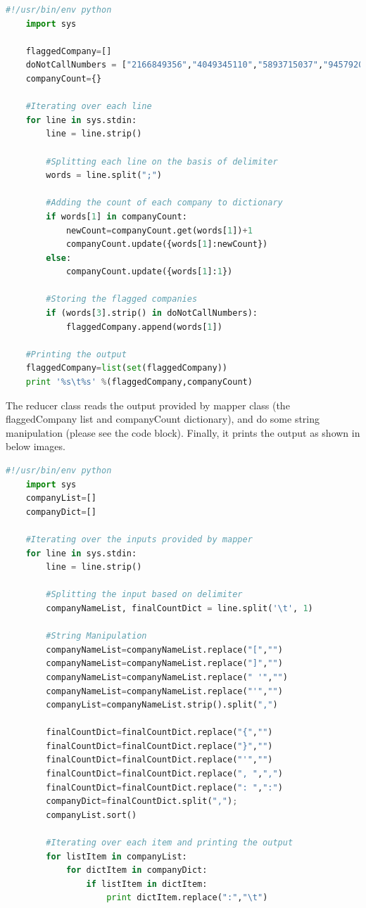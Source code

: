 \documentclass[a4paper, 10pt]{article}
\begin{document}
\begin{lstlisting}[language=Python, caption=Mapper for problem 2]
    #!/usr/bin/env python
    import sys
    
    flaggedCompany=[]
    doNotCallNumbers = ["2166849356","4049345110","5893715037","9457920329"]
    companyCount={}

    #Iterating over each line
    for line in sys.stdin:
        line = line.strip()

        #Splitting each line on the basis of delimiter
        words = line.split(";")

        #Adding the count of each company to dictionary
        if words[1] in companyCount:
            newCount=companyCount.get(words[1])+1
            companyCount.update({words[1]:newCount}) 
        else:
            companyCount.update({words[1]:1})

        #Storing the flagged companies   
        if (words[3].strip() in doNotCallNumbers):
            flaggedCompany.append(words[1])
    
    #Printing the output      
    flaggedCompany=list(set(flaggedCompany))
    print '%s\t%s' %(flaggedCompany,companyCount)  
\end{lstlisting}

The reducer class reads the output provided by mapper class (the flaggedCompany list and companyCount dictionary), and do some string manipulation (please see the code block). Finally, it prints the output as shown in below images.

\begin{lstlisting}[language=Python, caption=Reducer for problem 2]
    #!/usr/bin/env python
    import sys
    companyList=[]
    companyDict=[]

    #Iterating over the inputs provided by mapper
    for line in sys.stdin:
        line = line.strip()

        #Splitting the input based on delimiter
        companyNameList, finalCountDict = line.split('\t', 1)

        #String Manipulation
        companyNameList=companyNameList.replace("[","")
        companyNameList=companyNameList.replace("]","")
        companyNameList=companyNameList.replace(" '","")
        companyNameList=companyNameList.replace("'","")
        companyList=companyNameList.strip().split(",")
      
        finalCountDict=finalCountDict.replace("{","")
        finalCountDict=finalCountDict.replace("}","")
        finalCountDict=finalCountDict.replace("'","")
        finalCountDict=finalCountDict.replace(", ",",")
        finalCountDict=finalCountDict.replace(": ",":")
        companyDict=finalCountDict.split(",");
        companyList.sort()
        
        #Iterating over each item and printing the output
        for listItem in companyList:
            for dictItem in companyDict:
                if listItem in dictItem:
                    print dictItem.replace(":","\t")           
\end{lstlisting}
\end{document}
